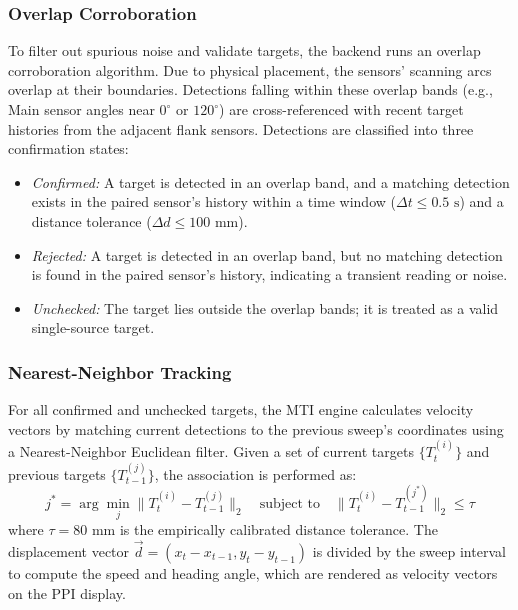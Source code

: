 \documentclass[conference]{IEEEtran}
\begin{document}
\subsubsection{Overlap Corroboration}
To filter out spurious noise and validate targets, the backend runs an overlap corroboration algorithm. Due to physical placement, the sensors' scanning arcs overlap at their boundaries. Detections falling within these overlap bands (e.g., Main sensor angles near $0^\circ$ or $120^\circ$) are cross-referenced with recent target histories from the adjacent flank sensors. Detections are classified into three confirmation states:
\begin{itemize}
    \item \textit{Confirmed:} A target is detected in an overlap band, and a matching detection exists in the paired sensor's history within a time window ($\Delta t \le 0.5\text{ s}$) and a distance tolerance ($\Delta d \le 100\text{ mm}$).
    \item \textit{Rejected:} A target is detected in an overlap band, but no matching detection is found in the paired sensor's history, indicating a transient reading or noise.
    \item \textit{Unchecked:} The target lies outside the overlap bands; it is treated as a valid single-source target.
\end{itemize}

\subsubsection{Nearest-Neighbor Tracking}
For all confirmed and unchecked targets, the MTI engine calculates velocity vectors by matching current detections to the previous sweep's coordinates using a Nearest-Neighbor Euclidean filter. Given a set of current targets $\{T_t^{(i)}\}$ and previous targets $\{T_{t-1}^{(j)}\}$, the association is performed as:
\begin{equation}
    j^* = \arg\min_j \| T_t^{(i)} - T_{t-1}^{(j)} \|_2 \quad \text{subject to} \quad \| T_t^{(i)} - T_{t-1}^{(j^*)} \|_2 \le \tau
    \label{eq:nn_assoc}
\end{equation}
where $\tau = 80\text{ mm}$ is the empirically calibrated distance tolerance. The displacement vector $\vec{d} = (x_t - x_{t-1}, y_t - y_{t-1})$ is divided by the sweep interval to compute the speed and heading angle, which are rendered as velocity vectors on the PPI display.
\end{document}
